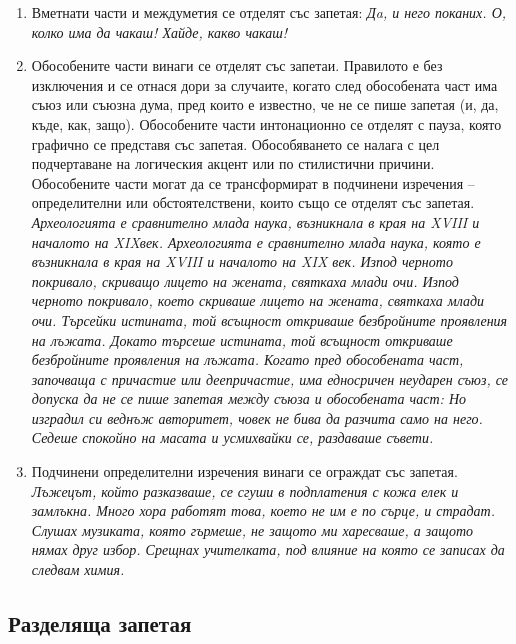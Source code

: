 \begin{enumerate}
    \item Вметнати части и междуметия се отделят със запетая: \textit{Дa, и него поканих. О, колко има да чакаш! Хайде, какво чакаш!}
    \item Обособените части винаги се отделят със запетаи. Правилото е без изключения и се отнася дори за случаите, когато след обособената част има съюз или съюзна дума, пред които е известно, че не се пише запетая (и, да, къде, как, защо). Обособените части интонационно се отделят с пауза, която графично се представя със запетая. Обособяването се налага с цел подчертаване на логическия акцент или по стилистични причини. Обособените части могат да се трансформират в подчинени изречения – определителни или обстоятелствени, които също се отделят със запетая.
\textit{Археологията е сравнително млада наука, възникнала в края на XVIII и началото на XIXвек. Археологията е сравнително млада наука, която е възникнала в края на XVIII и началото на XIX век.
Изпод черното покривало, скриващо лицето на жената, святкаха млади очи. Изпод черното покривало, което скриваше лицето на жената, святкаха млади очи.
Търсейки истината, той всъщност откриваше безбройните проявления на лъжата. Докато търсеше истината, той всъщност откриваше безбройните проявления на лъжата.
Когато пред обособената част, започваща с причастие или деепричастие, има едносричен неударен съюз, се допуска да не се пише запетая между съюза и обособената част: Но изградил си веднъж авторитет, човек не бива да разчита само на него. Седеше спокойно на масата и усмихвайки се, раздаваше съвети.}

    \item Подчинени определителни изречения винаги се ограждат със запетая.
\textit{Лъжецът, който разказваше, се сгуши в подплатения с кожа елек и замлъкна. Много хора работят това, което не им е по сърце, и страдат. Слушах музиката, която гърмеше, не защото ми харесваше, а защото нямах друг избор. Срещнах учителката, под влияние на която се записах да следвам химия.}
\end{enumerate}

\subsection{Разделяща запетая}

